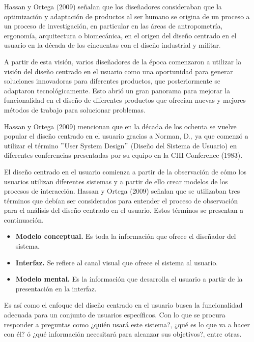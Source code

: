 Hassan y Ortega (2009) señalan que los diseñadores consideraban que la optimización y adaptación de productos al ser humano  se origina de un proceso a un proceso de investigación, en particular en las áreas de antropometría, ergonomía, arquitectura o biomecánica, en el origen del diseño centrado en el usuario en la década de los cincuentas con el diseño industrial y militar.

A partir de esta visión, varios diseñadores de la época comenzaron a utilizar la visión del diseño centrado en el usuario como una oportunidad para generar soluciones innovadoras para diferentes productos, que posteriormente se adaptaron tecnológicamente. Esto abrió un gran panorama para mejorar la funcionalidad en el diseño de diferentes productos que ofrecían nuevas y mejores métodos de trabajo para solucionar problemas.

Hassan y Ortega (2009) mencionan que en la década de los ochenta se vuelve popular el diseño centrado en el usuario gracias a Norman, D., ya que comenzó a utilizar el término $"$User System Design$"$ (Diseño del Sistema de Usuario) en diferentes conferencias presentadas por su equipo en la CHI Conference (1983).

El diseño centrado en el usuario comienza a partir de la observación de cómo los usuarios utilizan diferentes sistemas y a partir de ello crear modelos de los procesos de interacción. Hassan y Ortega (2009) señalan que se utilizaban tres términos que debían ser considerados para entender el proceso de observación para el análisis del diseño centrado en el usuario. Estos términos se presentan a continuación.

\begin{itemize}
  \item \textbf{Modelo conceptual.} Es toda la información que ofrece el diseñador del sistema.
  \item \textbf{Interfaz.} Se refiere al canal visual que ofrece el sistema al usuario.
  \item \textbf{Modelo mental.} Es la información que desarrolla el usuario a partir de la presentación en la interfaz.
\end{itemize}

Es así como el enfoque del diseño centrado en el usuario busca la funcionalidad adecuada para un conjunto de usuarios específicos. Con lo que se procura responder a preguntas como ¿quién usará este sistema?, ¿qué es lo que va a hacer con él? ó ¿qué información necesitará para alcanzar sus objetivos?, entre otras.

